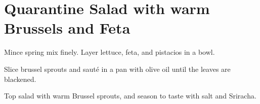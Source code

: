 \section{Quarantine Salad with warm Brussels and Feta}

\begin{recipe}



Mince spring mix finely. Layer lettuce, feta, and pistacios in a bowl. 


Slice brussel sprouts and sauté in a pan with olive oil until the leaves are blackened. 

Top salad with warm Brussel sprouts, and season to taste
with salt and Sriracha.

\end{recipe}
